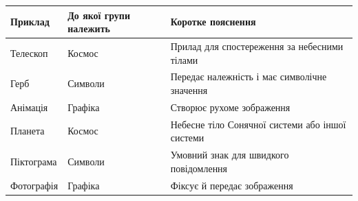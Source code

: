 \documentclass[11pt,a4paper]{article}
\begin{document}
\begin{tabularx}{\linewidth}{|>{\raggedright\arraybackslash}X|>{\raggedright\arraybackslash}X|>{\raggedright\arraybackslash}X|}\hline

\textbf{Приклад} & \textbf{До якої групи належить} & \textbf{Коротке пояснення} \\ \hline

Телескоп & Космос & Прилад для спостереження за небесними тілами \\ \hline

Герб & Символи & Передає належність і має символічне значення \\ \hline

Анімація & Графіка & Створює рухоме зображення \\ \hline

Планета & Космос & Небесне тіло Сонячної системи або іншої системи \\ \hline

Піктограма & Символи & Умовний знак для швидкого повідомлення \\ \hline

Фотографія & Графіка & Фіксує й передає зображення \\ \hline

\end{tabularx}\par
\end{document}
